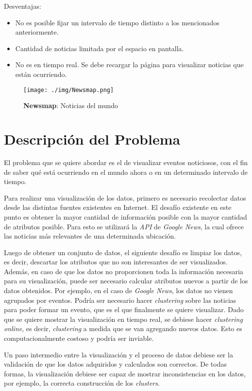 \documentclass[10pt]{article}
\begin{document}
	Desventajas:

	\begin{itemize}
		\item No es posible fijar un intervalo de tiempo distinto a los mencionados anteriormente.
		\item Cantidad de noticias limitada por el espacio en pantalla.
		\item No es en tiempo real. Se debe recargar la página para visualizar noticias que están ocurriendo.
	\end{itemize}

	\begin{figure}[h!]
		\centering
	    \texttt{[image: ./img/Newsmap.png]}
		\caption{\textbf{Newsmap}: Noticias del mundo}
		\label{newsmap}
	\end{figure}


\section{Descripción del Problema}
	El problema que se quiere abordar es el de visualizar eventos noticiosos, con el fin de saber qué está ocurriendo en el mundo ahora o en un determinado intervalo de tiempo.

	Para realizar una visualización de los datos, primero es necesario recolectar datos desde las distintas fuentes existentes en Internet. El desafío existente en este punto es obtener la mayor cantidad de información posible con la mayor cantidad de atributos posible. Para esto se utilizará la \emph{API} de \emph{Google News}, la cual ofrece las noticias más relevantes de una determinada ubicación.
	
	Luego de obtener un conjunto de datos, el siguiente desafío es limpiar los datos, es decir, descartar los atributos que no son interesantes de ser visualizados. Además, en caso de que los datos no proporcionen toda la información necesaria para su visualización, puede ser necesario calcular atributos nuevos a partir de los datos obtenidos. Por ejemplo, en el caso de \emph{Google News}, los datos no vienen agrupados por eventos. Podría ser necesario hacer \emph{clustering} sobre las noticias para poder formar un evento, que es el que finalmente se quiere visualizar. Dado que se quiere mostrar la visualización en tiempo real, se debiese hacer \emph{clustering online}, es decir, \emph{clustering} a medida que se van agregando nuevos datos. Esto es computacionalmente costoso y podría ser inviable\cite{doccluster}.
	
	Un paso intermedio entre la visualización y el proceso de datos debiese ser la validación de que los datos adquiridos y calculados son correctos. De todas formas, la visualización debiese ser capaz de mostrar inconsistencias en los datos, por ejemplo, la correcta construcción de los \emph{clusters}.
	
\end{document}

